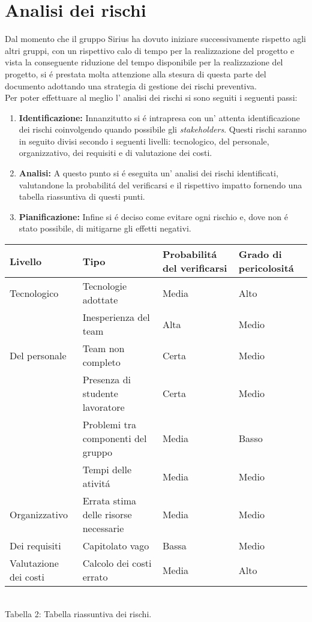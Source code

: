 \section{Analisi dei rischi}
Dal momento che il gruppo Sirius ha dovuto iniziare successivamente rispetto agli altri gruppi, con un rispettivo calo di tempo per la realizzazione del progetto e vista la conseguente riduzione del tempo disponibile per la realizzazione del progetto, si \'e prestata molta attenzione alla stesura di questa parte del documento adottando una strategia di gestione dei rischi preventiva.\\
Per poter effettuare al meglio l' analisi dei rischi si sono seguiti i seguenti passi:
\begin{enumerate}
	\item \textbf{Identificazione: }Innanzitutto si \'e intrapresa con un' attenta identificazione dei rischi coinvolgendo quando possibile gli \textit{stakeholders}. Questi rischi saranno in seguito divisi secondo i seguenti livelli: tecnologico, del personale, organizzativo, dei requisiti e di valutazione dei costi.
\item \textbf{Analisi: }A questo punto si \'e eseguita un' analisi dei rischi identificati, valutandone la probabilit\'a del verificarsi e il rispettivo impatto fornendo una tabella riassuntiva di questi punti.
\item \textbf{Pianificazione: }Infine si \'e deciso come evitare ogni rischio e, dove non \'e stato possibile, di mitigarne gli effetti negativi.
\end{enumerate}
\begin{center}
	\begin{tabular}{| >{\centering\arraybackslash}m{1in} | >{\centering\arraybackslash}m{1in} | >{\centering\arraybackslash}m{1in} | >{\centering\arraybackslash}m{1in} |}
		\hline
		\textbf{Livello} & \textbf{Tipo} & \textbf{Probabilit\'a del verificarsi}& \textbf{Grado di pericolosit\'a} \\
		\hline
		Tecnologico & Tecnologie adottate & Media & Alto\\
		\hline
		& Inesperienza del team & Alta & Medio \\		
		\cline{2-4}
		 Del personale   & Team non completo & Certa & Medio \\
		 \cline{2-4}
		& Presenza di studente lavoratore & Certa & Medio \\
		 \cline{2-4}
		 & Problemi tra componenti del gruppo & Media & Basso \\
		 \hline
		 & Tempi delle ativit\'a & Media & Medio \\
		 \cline{2-4}
		Organizzativo  & Errata stima delle risorse necessarie & Media & Medio \\
		 \hline
		 Dei requisiti & Capitolato vago & Bassa & Medio \\
		 \hline
		 Valutazione dei costi & Calcolo dei costi errato & Media & Alto \\
		 \hline
	\end{tabular}
	\\
	Tabella 2: Tabella riassuntiva dei rischi.
\end{center}
